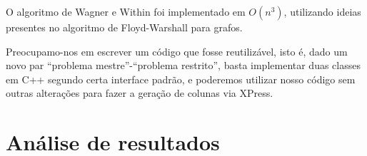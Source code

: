 \documentclass[letterpaper,11pt]{article}
\begin{document}
O algoritmo de Wagner e Within foi implementado em $O(n^3)$, utilizando
ideias presentes no algoritmo de Floyd-Warshall para grafos.  

Preocupamo-nos em escrever um código que fosse reutilizável, isto é,
dado um novo par ``problema mestre''-``problema restrito'', basta
implementar duas classes em C++ segundo certa interface padrão, e
poderemos utilizar nosso código sem outras alterações para fazer a
geração de colunas via XPress.

\section{Análise de resultados}



\end{document}
